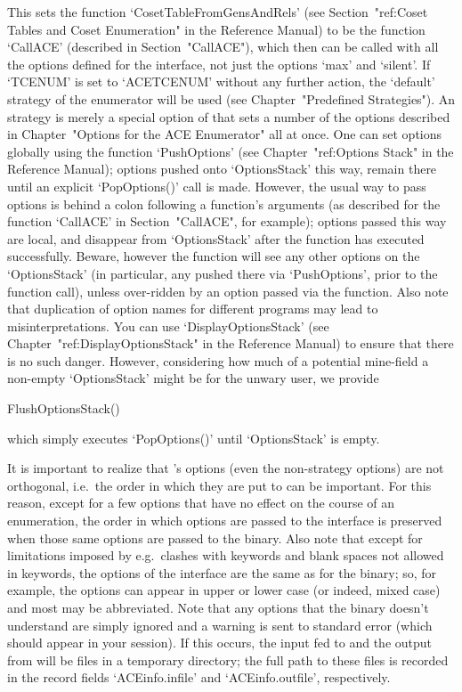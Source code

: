 This sets the function `CosetTableFromGensAndRels' (see 
Section~"ref:Coset Tables and Coset Enumeration" in the {\GAP} Reference  
Manual) to be the function `CallACE' (described in Section~"CallACE"),
which then can be called with all the options defined for the   {\ACE}
interface, not just the options `max' and `silent'. If `TCENUM' is set
to `ACETCENUM' without any further action,  the  `default' strategy of
the {\ACE} enumerator will be used (see Chapter~"Predefined Strategies"). 
An {\ACE} strategy is merely a special option of  {\ACE} that  sets  a
number of the options described in Chapter~"Options for the ACE Enumerator"
all at once. One can set options globally using the function `PushOptions'  
(see Chapter~"ref:Options Stack" in the {\GAP} Reference  Manual); options
pushed onto `OptionsStack'  this way,  remain there until an  explicit
`PopOptions()' call is made.  However,  the  usual way to pass options 
is behind a colon following a function's arguments   (as described for
the  function `CallACE' in Section~"CallACE",  for  example);  options
passed this way are local, and disappear from `OptionsStack' after the
function has executed successfully.  Beware, however the function will
see any other options on the `OptionsStack' (in particular, any pushed
there via `PushOptions', prior to the function call), unless over-ridden 
by an option passed via the function.  Also  note that duplication  of
option  names  for  different programs may lead to misinterpretations. 
You can use `DisplayOptionsStack' (see Chapter~"ref:DisplayOptionsStack"
in the {\GAP} Reference Manual) to ensure that there is no such danger. 
However, considering how much of a potential mine-field a non-empty 
`OptionsStack' might be for the unwary user, we provide

\>FlushOptionsStack()

which  simply  executes `PopOptions()' until `OptionsStack' is empty.

It is important to realize that {\ACE}'s options (even the non-strategy 
options) are not orthogonal, i.e.\ the order in which they are put to
{\ACE} can be important.  For this reason,  except for a  few options
that have no effect on the course of an  enumeration,  the  order  in
which  options  are passed to the {\ACE} interface is preserved  when 
those same options are passed to the {\ACE} binary.  Also  note  that
except for limitations imposed  by {\GAP}  e.g.\ clashes  with {\GAP}
keywords and blank spaces not allowed in keywords, the options of the
{\ACE} interface are the same as for the binary; so, for example, the
options can appear in upper or lower case (or indeed, mixed case) and
most may be abbreviated. Note that any options that the {\ACE} binary
doesn't  understand  are  simply  ignored  and  a  warning is sent to 
standard error (which should appear in your {\GAP} session).  If this
occurs,  the  input fed to  {\ACE} and the output from {\ACE} will be
files in a  temporary directory;  the full path  to  these  files  is
recorded in the record fields `ACEinfo.infile' and `ACEinfo.outfile',
respectively.


